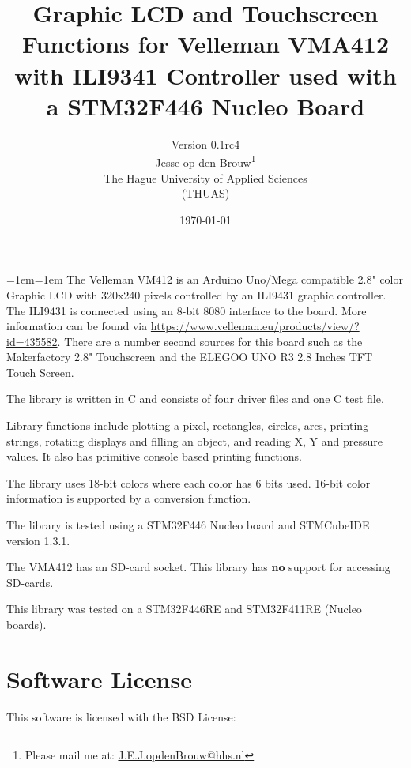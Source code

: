 \documentclass[12pt]{article}
\author{Version 0.1rc4\\[2ex]Jesse op den Brouw\thanks{Please mail me at: \href{mailto:J.E.J.opdenBrouw@hhs.nl}{J.E.J.opdenBrouw@hhs.nl}}\\The Hague University of Applied Sciences\\(THUAS)}
\title{Graphic LCD and Touchscreen Functions for Velleman VMA412 with ILI9341 Controller used with a STM32F446 Nucleo Board}
\date{\today}
\begin{document}
\raggedbottom
\maketitle

\vfill
{\small\leftskip=1em\rightskip=1em
The Velleman VM412 is an Arduino Uno/Mega compatible 2.8" color Graphic LCD with 320x240 pixels controlled by an ILI9431 graphic controller. The ILI9431 is connected using an 8-bit 8080 interface to the board. More information can be found via \url{https://www.velleman.eu/products/view/?id=435582}. There are a number second sources for this board such as the Makerfactory 2.8" Touchscreen and the ELEGOO UNO R3 2.8 Inches TFT Touch Screen.

The library is written in C and consists of four driver files and one C test file.

Library functions include plotting a pixel, rectangles, circles, arcs, printing strings, rotating displays and filling an object, and reading X, Y and pressure values. It also has primitive console based printing functions.

The library uses 18-bit colors where each color has 6 bits used. 16-bit color information is supported by a conversion function.

The library is tested using a STM32F446 Nucleo board and STMCubeIDE version 1.3.1.

The VMA412 has an SD-card socket. This library has \textbf{no} support for accessing SD-cards.

This library was tested on a STM32F446RE and STM32F411RE (Nucleo boards).

}
\vfill

\newpage

\tableofcontents


\newpage

\section{Software License}
This software is licensed with the BSD License:
\end{document}
